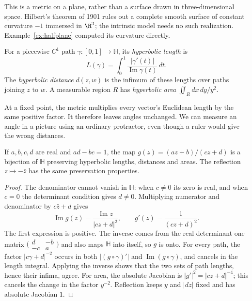 This is a metric on a plane, rather than a surface drawn in three-dimensional space. Hilbert's theorem of 1901 rules out a complete smooth surface of constant curvature $-1$ immersed in $\R^3$; the intrinsic model needs no such realization. Example~\ref{ex:halfplane} computed its curvature directly.

\begin{definition}
For a piecewise $C^1$ path $\gamma:[0,1]\to\mathbb H$, its \emph{hyperbolic length} is
\[
L(\gamma)=\int_0^1\frac{|\gamma'(t)|}{\operatorname{Im}\gamma(t)}\,dt.
\]
The \emph{hyperbolic distance} $d(z,w)$ is the infimum of these lengths over paths joining $z$ to $w$. A measurable region $R$ has \emph{hyperbolic area}
$\iint_R dx\,dy/y^2$.
\end{definition}

At a fixed point, the metric multiplies every vector's Euclidean length by the same positive factor. It therefore leaves angles unchanged. We can measure an angle in a picture using an ordinary protractor, even though a ruler would give the wrong distances.

\begin{proposition}[isometries]\label{geometry:prop:isometries}
If $a,b,c,d$ are real and $ad-bc=1$, the map $g(z)=(az+b)/(cz+d)$ is a bijection of $\mathbb H$ preserving hyperbolic lengths, distances and areas. The reflection $z\mapsto-\bar z$ has the same preservation properties.
\end{proposition}

\begin{proof}
The denominator cannot vanish in $\mathbb H$: when $c\ne0$ its zero is real, and when $c=0$ the determinant condition gives $d\ne0$. Multiplying numerator and denominator by $c\bar z+d$ gives
\[
\operatorname{Im}g(z)=\frac{\operatorname{Im}z}{|cz+d|^2},
\qquad g'(z)=\frac1{(cz+d)^2}.
\]
The first expression is positive. The inverse comes from the real determinant-one matrix $\bigl(\begin{smallmatrix}d&-b\\-c&a\end{smallmatrix}\bigr)$ and also maps $\mathbb H$ into itself, so $g$ is onto. For every path, the factor $|c\gamma+d|^{-2}$ occurs in both $|(g\circ\gamma)'|$ and $\operatorname{Im}(g\circ\gamma)$, and cancels in the length integral. Applying the inverse shows that the two sets of path lengths, hence their infima, agree. For area, the absolute Jacobian is $|g'|^2=|cz+d|^{-4}$; this cancels the change in the factor $y^{-2}$. Reflection keeps $y$ and $|dz|$ fixed and has absolute Jacobian $1$.
\end{proof}

